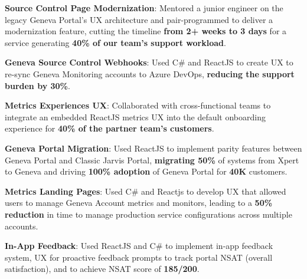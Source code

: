 \documentclass[letterpaper,11pt]{article}
\newcommand{\resumeItem}[2]{
  \item\small{
    \textbf{#1}{: #2 \vspace{-2pt}}
  }
}
\begin{document}
        \resumeItem{Source Control Page Modernization}{Mentored a junior engineer on the legacy Geneva Portal's UX architecture and pair-programmed to deliver a modernization feature, cutting the timeline \textbf{from 2+ weeks to 3 days} for a service generating \textbf{40\% of our team's support workload}.
        }

        
        
        \resumeItem{Geneva Source Control Webhooks}{Used C\# and ReactJS to create UX to re-sync Geneva Monitoring accounts to Azure DevOps, \textbf{reducing the support burden by 30\%}.}


       \resumeItem{Metrics Experiences UX}{Collaborated with cross-functional teams to integrate an embedded ReactJS metrics UX into the default onboarding experience for \textbf{40\% of the partner team's customers}.
       }

        \resumeItem{Geneva Portal Migration}{Used ReactJS to implement parity features  between Geneva Portal and Classic Jarvis Portal, \textbf{migrating 50\%} of systems from Xpert to Geneva and driving \textbf{100\% adoption} of Geneva Portal for \textbf{40K} customers.   
        }

        \resumeItem{Metrics Landing Pages}{Used C\# and Reactjs to develop UX that allowed users to manage Geneva Account metrics and monitors, leading to a \textbf{50\% reduction} in time to manage production service configurations across multiple accounts.}
        
       \resumeItem{In-App Feedback}{Used ReactJS and C\# to implement in-app feedback system, UX for proactive feedback prompts to track portal NSAT (overall satisfaction), and to achieve NSAT score of \textbf{185/200}.
        }
\end{document}
